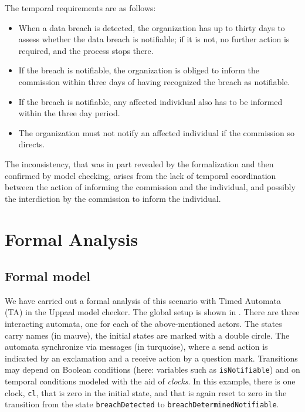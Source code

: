 The temporal requirements are as follows:
\begin{itemize}
\item When a data breach is detected, the organization has up to thirty days to
  assess whether the data breach is notifiable; if it is not, no further
  action is required, and the process stops there. 
\item If the breach is notifiable, the organization is obliged to inform the
  commission within three days of having recognized the breach as notifiable.
\item If the breach is notifiable, any affected individual also has to be
  informed within the three day period.
\item The organization must not notify an affected individual if the
  commission so directs.
\end{itemize}

The inconsistency, that was in part revealed by the formalization and then
confirmed by model checking, arises from the lack of temporal coordination
between the action of informing the commission and the individual, and
possibly the interdiction by the commission to inform the individual.


\section{Formal Analysis}\label{sec:formal_analysis}

\subsection{Formal model}\label{sec:formal_model}

We have carried out a formal analysis of this scenario with Timed Automata
(TA) in the Uppaal \cite{larsen1997uppaal} model checker. The global setup is
shown in . There are three interacting automata, one for each
of the above-mentioned actors. The states carry names (in mauve), the initial
states are marked with a double circle. The automata synchronize via messages
(in turquoise), where a send action is indicated by an exclamation and a
receive action by a question mark. Transitions may depend on Boolean
conditions (here: variables such as \texttt{isNotifiable}) and on temporal
conditions modeled with the aid of \emph{clocks}. In this example, there is
one clock, \texttt{cl}, that is zero in the initial state, and that is again
reset to zero in the transition from the state \texttt{breachDetected} to
\texttt{breachDeterminedNotifiable}.


